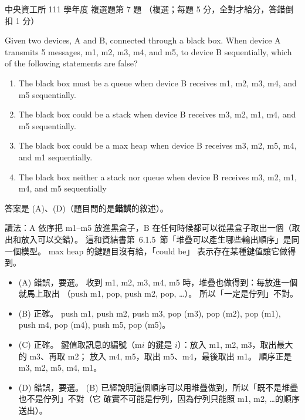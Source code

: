 \begin{pastexam}[label={px:ncu-111-dsa-07}]{中央資工所 111 學年度 複選題第 7 題}
（複選；每題 5 分，全對才給分，答錯倒扣 1 分）

Given two devices, A and B, connected through a black box. When device A transmits 5 messages, m1,
m2, m3, m4, and m5, to device B sequentially, which of the following statements are false?
\begin{enumerate}[label=(\Alph*)]
\item The black box must be a queue when device B receives m1, m2, m3, m4, and m5 sequentially.
\item The black box could be a stack when device B receives m3, m2, m1, m4, and m5 sequentially.
\item The black box could be a max heap when device B receives m3, m2, m5, m4, and m1
sequentially.
\item The black box neither a stack nor queue when device B receives m3, m2, m1, m4, and m5
sequentially
\end{enumerate}
\end{pastexam}

\begin{pastsoln}
答案是 (A)、(D)（題目問的是\textbf{錯誤}的敘述）。

讀法：A 依序把 m1--m5 放進黑盒子，B 在任何時候都可以從黑盒子取出一個（取出和放入可以交錯）。
這和資結書第~6.1.5~節「堆疊可以產生哪些輸出順序」是同一個模型。 max heap 的鍵題目沒有給，「could be」
表示存在某種鍵值讓它做得到。
\begin{itemize}
\item (A) 錯誤，要選。 收到 m1, m2, m3, m4, m5 時，堆疊也做得到：每放進一個就馬上取出
（push m1, pop, push m2, pop, \ldots）。 所以「一定是佇列」不對。
\item (B) 正確。 push m1, push m2, push m3, pop (m3), pop (m2), pop (m1), push m4, pop (m4), push m5,
pop (m5)。
\item (C) 正確。 鍵值取訊息的編號（m$i$ 的鍵是 $i$）：放入 m1, m2, m3，取出最大的 m3、再取 m2；
放入 m4, m5，取出 m5、m4，最後取出 m1。 順序正是 m3, m2, m5, m4, m1。
\item (D) 錯誤，要選。 (B) 已經說明這個順序可以用堆疊做到，所以「既不是堆疊也不是佇列」不對（它
確實不可能是佇列，因為佇列只能照 m1, m2, \ldots 的順序送出）。
\end{itemize}
\end{pastsoln}

